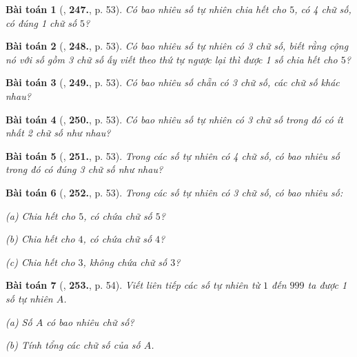 \documentclass{article}
\numberwithin{equation}{section}
\newtheorem{baitoan}{Bài toán}
\begin{document}
\begin{baitoan}[\cite{Binh_Toan_6_tap_1}, \textbf{247.}, p. 53]
	Có bao nhiêu số tự nhiên chia hết cho $5$, có 4 chữ số, có đúng 1 chữ số $5$?
\end{baitoan}

\begin{baitoan}[\cite{Binh_Toan_6_tap_1}, \textbf{248.}, p. 53]
	Có bao nhiêu số tự nhiên có 3 chữ số, biết rằng cộng nó với số gồm 3 chữ số ấy viết theo thứ tự ngược lại thì được 1 số chia hết cho $5$?
\end{baitoan}

\begin{baitoan}[\cite{Binh_Toan_6_tap_1}, \textbf{249.}, p. 53]
	Có bao nhiêu số chẵn có 3 chữ số, các chữ số khác nhau?
\end{baitoan}

\begin{baitoan}[\cite{Binh_Toan_6_tap_1}, \textbf{250.}, p. 53]
	Có bao nhiêu số tự nhiên có 3 chữ số trong đó có ít nhất 2 chữ số như nhau?
\end{baitoan}

\begin{baitoan}[\cite{Binh_Toan_6_tap_1}, \textbf{251.}, p. 53]
	Trong các số tự nhiên có 4 chữ số, có bao nhiêu số trong đó có đúng 3 chữ số như nhau?
\end{baitoan}

\begin{baitoan}[\cite{Binh_Toan_6_tap_1}, \textbf{252.}, p. 53]
	Trong các số tự nhiên có 3 chữ số, có bao nhiêu số:
	\begin{enumerate*}
		\item[(a)] Chia hết cho $5$, có chứa chữ số $5$?
		\item[(b)] Chia hết cho $4$, có chứa chữ số $4$?
		\item[(c)] Chia hết cho $3$, không chứa chữ số $3$?
	\end{enumerate*}
\end{baitoan}

\begin{baitoan}[\cite{Binh_Toan_6_tap_1}, \textbf{253.}, p. 54]
	Viết liên tiếp các số tự nhiên từ $1$ đến $999$ ta được 1 số tự nhiên $A$.
	\begin{enumerate*}
		\item[(a)] Số $A$ có bao nhiêu chữ số?
		\item[(b)] Tính tổng các chữ số của số $A$.
	\end{enumerate*}
\end{baitoan}
\end{document}
